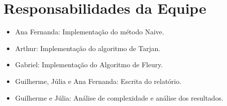 \documentclass{article}
\begin{document}
\section*{Responsabilidades da Equipe}
\begin{itemize}
    \item Ana Fernanda: Implementação do método Naive.
    \item Arthur: Implementação do algoritmo de Tarjan.
    \item Gabriel: Implementação do Algoritmo de Fleury.
    \item Guilherme, Júlia e Ana Fernanda: Escrita do relatório.
    \item Guilherme e Júlia: Análise de complexidade e análise dos resultados.
\end{itemize}



\end{document}

